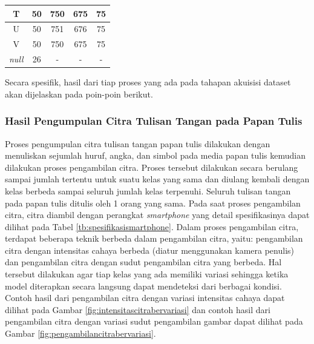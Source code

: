 \begin{center}
\begin{longtable}[c]{|c|c|c|c|c|}
  T              & 50                    & 750                     & 675                                                                       & 75                                                                             \\ \hline
  U              & 50                    & 751                     & 676                                                                       & 75                                                                             \\ \hline
  V              & 50                    & 750                     & 675                                                                       & 75                                                                             \\ \hline
  \textit{null}  & 26                    & -                       & -                                                                         & -                                                                              \\ \hline
  \end{longtable}
\end{center}

Secara spesifik, hasil dari tiap proses yang ada pada tahapan akuisisi dataset akan dijelaskan pada poin-poin berikut. \par

\subsubsection{Hasil Pengumpulan Citra Tulisan Tangan pada Papan Tulis}
\label{subsubsec:hasilpengumpulancitra}

Proses pengumpulan citra tulisan tangan papan tulis dilakukan dengan menuliskan sejumlah huruf, angka, dan simbol pada media papan tulis kemudian dilakukan proses pengambilan citra. Proses tersebut dilakukan secara berulang sampai jumlah tertentu untuk suatu kelas yang sama dan diulang kembali dengan kelas berbeda sampai seluruh jumlah kelas terpenuhi. Seluruh tulisan tangan pada papan tulis ditulis oleh 1 orang yang sama. Pada saat proses pengambilan citra, citra diambil dengan perangkat \textit{smartphone} yang detail spesifikasinya dapat dilihat pada Tabel \ref*{tb:spesifikasismartphone}. Dalam proses pengambilan citra, terdapat beberapa teknik berbeda dalam pengambilan citra, yaitu: pengambilan citra dengan intensitas cahaya berbeda (diatur menggunakan kamera penulis) dan pengambilan citra dengan sudut pengambilan citra yang berbeda. Hal tersebut dilakukan agar tiap kelas yang ada memiliki variasi sehingga ketika model diterapkan secara langsung dapat mendeteksi dari berbagai kondisi. Contoh hasil dari pengambilan citra dengan variasi intensitas cahaya dapat dilihat pada Gambar \ref{fig:intensitascitrabervariasi} dan contoh hasil dari pengambilan citra dengan variasi sudut pengambilan gambar dapat dilihat pada Gambar \ref*{fig:pengambilancitrabervariasi}.  \par

